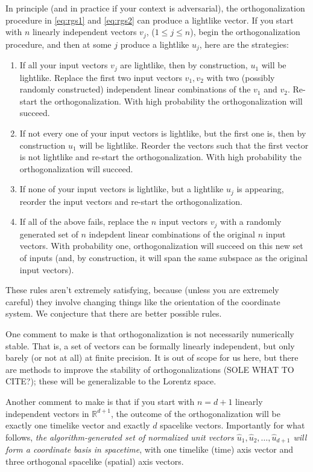 \documentclass{article}
\begin{document}
In principle (and in practice if your context is adversarial), the orthogonalization procedure in \eqref{eq:rgs1} and \eqref{eq:rgs2} can produce a lightlike vector.
If you start with $n$ linearly independent vectors $v_j$, ($1\leq j\leq n$), begin the orthogonalization procedure, and then at some $j$ produce a lightlike $u_j$, here are the strategies:
\begin{enumerate}
    \item If all your input vectors $v_j$ are lightlike, then by construction, $u_1$ will be lightlike.
    Replace the first two input vectors $v_1, v_2$ with two (possibly randomly constructed) independent linear combinations of the $v_1$ and $v_2$.
    Re-start the orthogonalization.
    With high probability the orthogonalization will succeed.
    \item If not every one of your input vectors is lightlike, but the first one is, then by construction $u_1$ will be lightlike.
    Reorder the vectors such that the first vector is not lightlike and re-start the orthogonalization.
    With high probability the orthogonalization will succeed.
    \item If none of your input vectors is lightlike, but a lightlike $u_j$ is appearing, reorder the input vectors and re-start the orthogonalization.
    \item If all of the above fails, replace the $n$ input vectors $v_j$ with a randomly generated set of $n$ indepdent linear combinations of the original $n$ input vectors.
    With probability one, orthogonalization will succeed on this new set of inputs (and, by construction, it will span the same subspace as the original input vectors).
\end{enumerate}
These rules aren't extremely satisfying, because (unless you are extremely careful) they involve changing things like the orientation of the coordinate system.
We conjecture that there are better possible rules.

One comment to make is that orthogonalization is not necessarily numerically stable.
That is, a set of vectors can be formally linearly independent, but only barely (or not at all) at finite precision.
It is out of scope for us here, but there are methods to improve the stability of orthogonalizations (SOLE WHAT TO CITE?); these will be generalizable to the Lorentz space.

Another comment to make is that if you start with $n=d+1$ linearly independent vectors in $\mathbb{R}^{d+1}$, the outcome of the orthogonalization will be exactly one timelike vector and exactly $d$ spacelike vectors.
Importantly for what follows, \emph{the algorithm-generated set of normalized unit vectors $\hat{u}_1,\hat{u}_2,\ldots,\hat{u}_{d+1}$ will form a coordinate basis in spacetime}, with one timelike (time) axis vector and three orthogonal spacelike (spatial) axis vectors.
\end{document}

